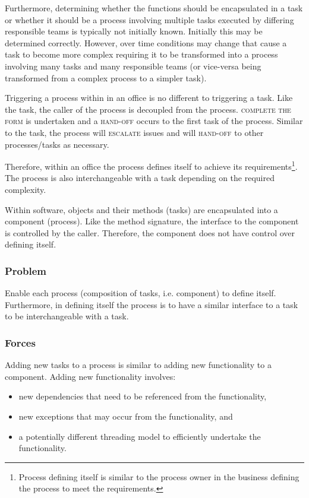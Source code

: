 \documentclass[prodmode]{style/acmlarge}
\begin{document}
Furthermore, determining whether the functions should be encapsulated in a task
or whether it should be a process involving multiple tasks executed by differing
responsible teams is typically not initially known.  Initially this may be
determined correctly.  However, over time conditions may change that cause a
task to become more complex requiring it to be transformed into a process
involving many tasks and many responsible teams (or vice-versa being transformed
from a complex process to a simpler task).

Triggering a process within in an office is no different to triggering a task.
Like the task, the caller of the process is decoupled from the process.
\textsc{complete the form} is undertaken and a \textsc{hand-off} occurs to the
first task of the process.  Similar to the task, the process will
\textsc{escalate} issues and will \textsc{hand-off} to other processes/tasks as
necessary.

Therefore, within an office the process defines itself to achieve its
requirements\footnote{Process defining itself is similar to the process owner in
the business defining the process to meet the requirements.}.  The process is
also interchangeable with a task depending on the required complexity.

Within software, objects and their methods (tasks) are encapsulated into a
component (process).  Like the method signature, the interface to the component
is controlled by the caller.  Therefore, the component does not have control
over defining itself.

\subsubsection*{\textbf{Problem}} Enable each process (composition of tasks,
i.e. component) to define itself.  Furthermore, in defining itself the process
is to have a similar interface to a task to be interchangeable with a task.

\subsubsection*{Forces} Adding new tasks to a process is similar to adding new
functionality to a component.  Adding new functionality involves:
\begin{itemize}
  \item new dependencies that need to be referenced from the functionality,
  \item new exceptions that may occur from the functionality, and
  \item a potentially different threading model to efficiently undertake the functionality. 
\end{itemize}
\end{document}
